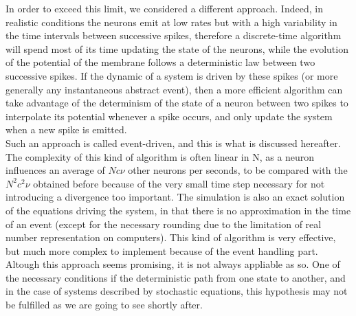 	In order to exceed this limit, we considered a different approach. Indeed, in realistic conditions the neurons emit at low rates but with a high variability in the time intervals between successive spikes, therefore a discrete-time algorithm will spend most of its time updating the state of the neurons, while the evolution of the potential of the membrane follows a deterministic law between two successive spikes. If the dynamic of a system is driven by these spikes (or more generally any instantaneous abstract event), then a more efficient algorithm can take advantage of the determinism of the state of a neuron between two spikes to interpolate its potential whenever a spike occurs, and only update the system when a new spike is emitted.\\
	Such an approach is called event-driven, and this is what is discussed hereafter. The complexity of this kind of algorithm is often linear in N, as a neuron influences an average of $Nc\nu$ other neurons per seconds, to be compared with the $N^2c^2\nu$ obtained before because of the very small time step necessary for not introducing a divergence too important. The simulation is also an exact solution of the equations driving the system, in that there is no approximation in the time of an event (except for the necessary rounding due to the limitation of real number representation on computers). This kind of algorithm is very effective, but much more complex to implement because of the event handling part.\\

	Altough this approach seems promising, it is not always appliable as so. One of the necessary conditions if the deterministic path from one state to another, and in the case of systems described by stochastic equations, this hypothesis may not be fulfilled as we are going to see shortly after.


